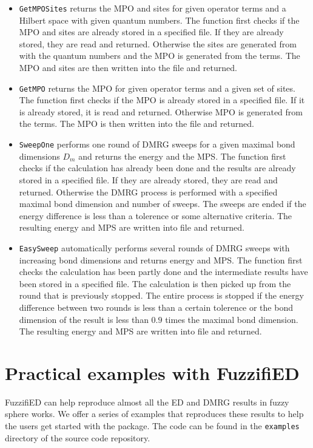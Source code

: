 \documentclass{timesjhep}
\begin{document}
\begin{itemize}
    \item \lstinline|GetMPOSites| returns the MPO and sites for given operator terms and a Hilbert space with given quantum numbers. The function first checks if the MPO and sites are already stored in a specified file. If they are already stored, they are read and returned. Otherwise the sites are generated from with the quantum numbers and the MPO is generated from the terms. The MPO and sites are then written into the file and returned. 
    \item \lstinline|GetMPO| returns the MPO for given operator terms and a given set of sites. The function first checks if the MPO is already stored in a specified file. If it is already stored, it is read and returned. Otherwise MPO is generated from the terms. The MPO is then written into the file and returned. 
    \item \lstinline|SweepOne| performs one round of DMRG sweeps for a given maximal bond dimensions $D_m$ and returns the energy and the MPS. The function first checks if the calculation has already been done and the results are already stored in a specified file. If they are already stored, they are read and returned. Otherwise the DMRG process is performed with a specified maximal bond dimension and number of sweeps. The sweeps are ended if the energy difference is less than a tolerence or some alternative criteria. The resulting energy and MPS are written into file and returned.
    \item \lstinline|EasySweep| automatically performs several rounds of DMRG sweeps with increasing bond dimensions and returns energy and MPS. The function first checks the calculation has been partly done and the intermediate results have been stored in a specified file. The calculation is then picked up from the round that is previously stopped. The entire process is stopped if the energy difference between two rounds is less than a certain tolerence or the bond dimension of the result is less than $0.9$ times the maximal bond dimension. The resulting energy and MPS are written into file and returned.
\end{itemize}

\section{Practical examples with FuzzifiED}
\label{sec:examples}

FuzzifiED can help reproduce almost all the ED and DMRG results in fuzzy sphere works. We offer a series of examples that reproduces these results to help the users get started with the package. The code can be found in the \lstinline|examples| directory of the source code repository. 
\end{document}
